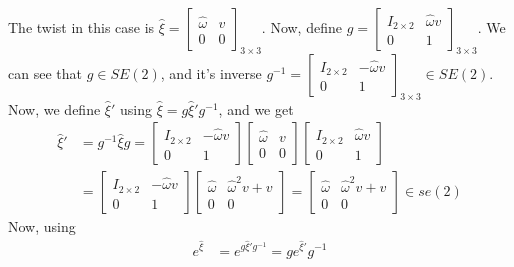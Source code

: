 The twist in this case is \( \hat{\xi} = \left[ \begin{array}{cc} \hat \omega & v \\ 0 & 0 \end{array} \right]_{3\times 3} \).
Now, define \( g = \begin{bmatrix}
    I_{2\times 2} & \hat \omega v \\
    0             & 1
\end{bmatrix}_{3\times 3}
\).
We can see that \( g \in SE(2) \), and it's inverse \( g^{-1} = \begin{bmatrix}
    I_{2\times 2} & -\hat \omega v \\
    0             & 1
\end{bmatrix}_{3\times 3} \in SE(2)
\).
Now, we define \( \hat \xi' \) using \( \hat \xi = g \hat \xi' g^{-1} \), and we get
\begin{align*}
    \hat \xi'
     & =
    g^{-1} \hat \xi g
    =
    \begin{bmatrix}
        I_{2\times 2} & -\hat \omega v \\
        0             & 1
    \end{bmatrix}
    \begin{bmatrix}
        \hat \omega & v \\
        0           & 0
    \end{bmatrix}
    \begin{bmatrix}
        I_{2\times 2} & \hat \omega v \\
        0             & 1
    \end{bmatrix}
    \\ & =
    \begin{bmatrix}
        I_{2\times 2} & -\hat \omega v \\
        0             & 1
    \end{bmatrix}
    \begin{bmatrix}
        \hat \omega & \hat \omega^2 v + v \\
        0           & 0
    \end{bmatrix}
    =
    \begin{bmatrix}
        \hat \omega & \hat \omega^2 v + v \\
        0           & 0
    \end{bmatrix}
    \in se(2)
\end{align*}
Now, using
\begin{align*}
    e^{\hat \xi}
     & =
    e^{g \hat \xi' g^{-1}}
    =
    g e^{\hat \xi'} g^{-1}
\end{align*}
